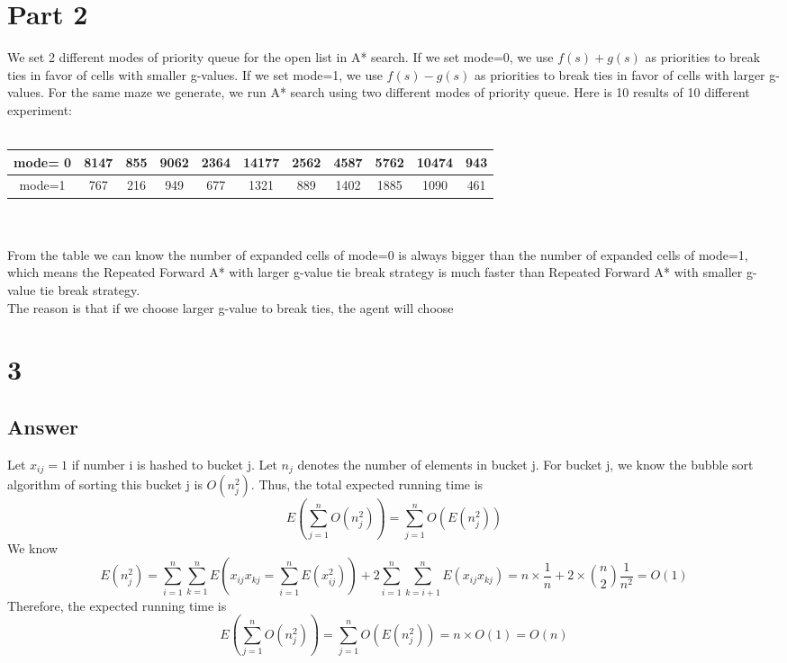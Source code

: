 \documentclass[
	12pt, %
]{fphw}
\begin{document}

\section*{Part 2}



We set 2 different modes of priority queue for the open list in A* search. If we set mode=0, we use $f(s)+g(s)$ as priorities to break ties in favor of cells with smaller g-values. If we set mode=1, we use $f(s)-g(s)$ as priorities to break ties in favor of cells with larger g-values. For the same maze we generate, we run A* search using two different modes of priority queue.  Here is 10 results of 10 different experiment:\\ \\
\begin{tabular}{|c|c|c|c|c|c|c|c|c|c|c|} 
\hline 
mode= 0&8147&855&9062&2364&14177&2562&4587&5762&10474&943\\
\hline  
mode=1&767&216&949&677&1321&889&1402&1885&1090&461\\
\hline 
\end{tabular}\\
\\
From the table we can know the number of expanded cells of mode=0 is always bigger than the number of expanded cells of mode=1, which means the  Repeated Forward A* with larger g-value tie break strategy
is much faster than Repeated Forward A* with smaller g-value tie break
strategy.\\
The reason is that  if we choose larger g-value to break ties, the agent will choose 






\section*{3}








\subsection*{Answer} 
Let $x_{ij}=1$ if number i is hashed to bucket j. Let $n_j$ denotes the number of elements in bucket j. For bucket j, we know the bubble sort algorithm of sorting this bucket j is $O(n_j^2)$. Thus, the total expected running time is $$E(\sum_{j=1}^n O(n_j^2))=\sum_{j=1}^n O(E(n_j^2))$$
We know $$E(n_j^2)=\sum_{i=1}^n\sum_{k=1}^nE(x_{ij}x_{kj}=\sum_{i=1}^nE(x_{ij}^2))+2\sum_{i=1}^n\sum_{k=i+1}^nE(x_{ij}x_{kj})=n\times \frac{1}{n}+2\times\binom{n}{2}\frac{1}{n^2}=O(1)$$ Therefore, the expected running time is $$E(\sum_{j=1}^n O(n_j^2))=\sum_{j=1}^n O(E(n_j^2))=n\times O(1)=O(n)$$
\end{document}
